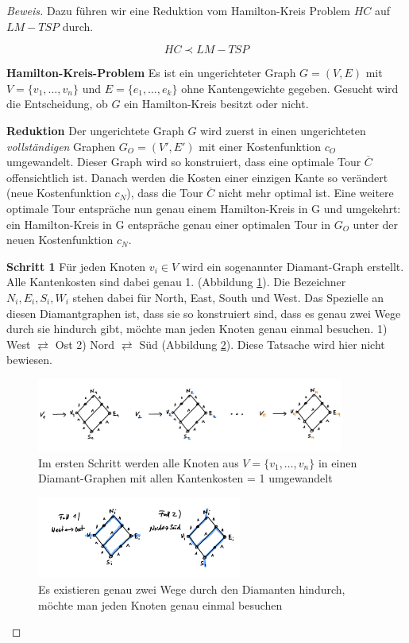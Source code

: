 \documentclass[a4paper,11pt]{scrreprt}
\begin{document}
\begin{proof}[Beweis]
Dazu führen wir eine Reduktion vom Hamilton-Kreis Problem $HC$ auf $LM-TSP$ durch.

\[HC \prec LM-TSP \]

\textbf{Hamilton-Kreis-Problem} Es ist ein ungerichteter Graph $G = (V, E)$ mit $V = \{v_1, \dots, v_n\}$ und $E = \{e_1, \dots, e_k\}$ ohne Kantengewichte gegeben. Gesucht wird die Entscheidung, ob $G$ ein Hamilton-Kreis besitzt oder nicht.

\textbf{Reduktion} Der ungerichtete Graph $G$ wird zuerst in einen ungerichteten \emph{vollständigen} Graphen $G_O = (V', E')$ mit einer Kostenfunktion $c_O$ umgewandelt. Dieser Graph wird so konstruiert, dass eine optimale Tour $\overline{C}$ offensichtlich ist. Danach werden die Kosten einer einzigen Kante so verändert (neue Kostenfunktion $c_N$), dass die Tour $\overline{C}$ nicht mehr optimal ist. Eine weitere optimale Tour entspräche nun genau einem Hamilton-Kreis in G und umgekehrt: ein Hamilton-Kreis in G entspräche genau einer optimalen Tour in $G_O$ unter der neuen Kostenfunktion $c_N$. 

\textbf{Schritt 1} Für jeden Knoten $v_i \in V$ wird ein sogenannter Diamant-Graph erstellt. Alle Kantenkosten sind dabei genau 1. (Abbildung \ref{fig:lm-tsp-proof-step1}). Die Bezeichner ${N_i, E_i, S_i, W_i}$ stehen dabei für North, East, South und West. Das Spezielle an diesen Diamantgraphen ist, dass sie so konstruiert sind, dass es genau zwei Wege durch sie hindurch gibt, möchte man jeden Knoten genau einmal besuchen. 1) West $\rightleftarrows$ Ost 2) Nord $\rightleftarrows$ Süd (Abbildung \ref{fig:lm-tsp-proof-step1-ways}). Diese Tatsache wird hier nicht bewiesen.

\begin{figure}[H]
\centering
\includegraphics[width=0.9\textwidth]{lm_tsp_proof_step1.png}
\caption{Im ersten Schritt werden alle Knoten aus $V = \{v_1, \dots, v_n \}$ in einen Diamant-Graphen mit allen Kantenkosten = 1 umgewandelt}
\label{fig:lm-tsp-proof-step1}
\end{figure}

\begin{figure}[H]
\centering
\includegraphics[width=0.6\textwidth]{lm_tsp_proof_step1_ways.png}
\caption{Es existieren genau zwei Wege durch den Diamanten hindurch, möchte man jeden Knoten genau einmal besuchen}
\label{fig:lm-tsp-proof-step1-ways}
\end{figure}


\end{proof}
\end{document}
